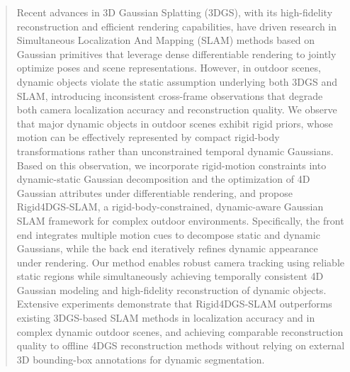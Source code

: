 \documentclass[letterpaper, 10 pt, conference]{ieeeconf}  %
\begin{document}
\begin{abstract}
Recent advances in 3D Gaussian Splatting (3DGS), with its high-fidelity reconstruction and efficient rendering capabilities, have driven research in Simultaneous Localization And Mapping (SLAM) methods based on Gaussian primitives that leverage dense differentiable rendering to jointly optimize poses and scene representations. However, in outdoor scenes, dynamic objects violate the static assumption underlying both 3DGS and SLAM, introducing inconsistent cross-frame observations that degrade both camera localization accuracy and reconstruction quality.
We observe that major dynamic objects in outdoor scenes exhibit rigid priors, whose motion can be effectively represented by compact rigid-body transformations rather than unconstrained temporal dynamic Gaussians. Based on this observation, we incorporate rigid-motion constraints into dynamic-static Gaussian decomposition and the optimization of 4D Gaussian attributes under differentiable rendering, and propose Rigid4DGS-SLAM, a rigid-body-constrained, dynamic-aware Gaussian SLAM framework for complex outdoor environments. Specifically, the front end integrates multiple motion cues to decompose static and dynamic Gaussians, while the back end iteratively refines dynamic appearance under rendering. Our method enables robust camera tracking using reliable static regions while simultaneously achieving temporally consistent 4D Gaussian modeling and high-fidelity reconstruction of dynamic objects.
Extensive experiments demonstrate that Rigid4DGS-SLAM outperforms existing 3DGS-based SLAM methods in localization accuracy and  in complex dynamic outdoor scenes, and achieving comparable reconstruction quality to offline 4DGS reconstruction methods without relying on external 3D bounding-box annotations for dynamic segmentation.
\end{abstract}
\end{document}
